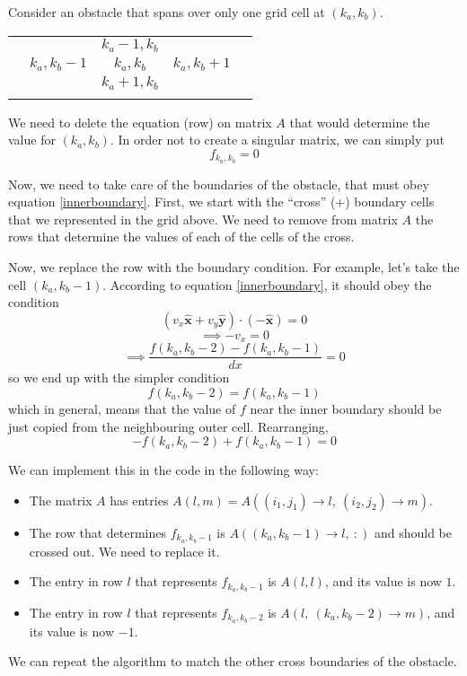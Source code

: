 \documentclass{article}
\newcommand{\uv}[1]{\hat{\mathbf{#1}}}
\begin{document}
Consider an obstacle that spans over only one grid cell at $(k_a,k_b)$.

\begin{tabular}{c|c|c|c|c}
& & & & \\ \hline
& & $k_a-1,k_b$ & & \\ \hline
& $k_a,k_b-1$ & $k_a,k_b$ & $k_a,k_b+1$ & \\ \hline
& & $k_a+1,k_b$ & & \\ \hline
& & & &
\end{tabular}

We need to delete the equation (row) on matrix $A$ that would determine the value for
$(k_a,k_b)$. In order not to create a singular matrix, we can simply put
\[ f_{k_a,k_b} = 0 \]

Now, we need to take care of the boundaries of the obstacle, that must obey
equation \ref{innerboundary}. First, we start with the ``cross'' (+) boundary cells that
we represented in the grid above. We need to remove from matrix $A$ the rows that
determine the values of each of the cells of the cross.

Now, we replace the row with the boundary condition. For example, let's take the
cell $(k_a,k_b-1)$. According to equation \ref{innerboundary}, it should obey
the condition
\[ (v_x \uv x + v_y \uv y) \cdot (-\uv x) = 0 \]
\[ \implies -v_x = 0 \]
\[ \implies \frac{f(k_a,k_b-2)-f(k_a,k_b-1)}{dx} = 0\]
so we end up with the simpler condition
\[ f(k_a,k_b-2) = f(k_a,k_b-1)  \]
which in general, means that the value of $f$ near the inner boundary should be just
copied from the neighbouring outer cell. Rearranging,
\[ -f(k_a,k_b-2) + f(k_a,k_b-1) = 0 \]

We can implement this in the code in the following way:
\begin{itemize}
\item The matrix $A$ has entries $A(l,m) = A((i_1,j_1)\to l,\ (i_2,j_2)\to m)$.
\item The row that determines $f_{k_a,k_b-1}$ is $A((k_a,k_b-1)\to l,\ :)$ and should be
crossed out. We need to replace it.
\item The entry in row $l$ that represents $f_{k_a,k_b-1}$ is $A(l,l)$, and its
value is now $1$.
\item The entry in row $l$ that represents $f_{k_a,k_b-2}$ is
$A(l,\ (k_a,k_b-2)\to m)$, and its value is now $-1$.
\end{itemize}

We can repeat the algorithm to match the other cross boundaries of the obstacle.
\end{document}
